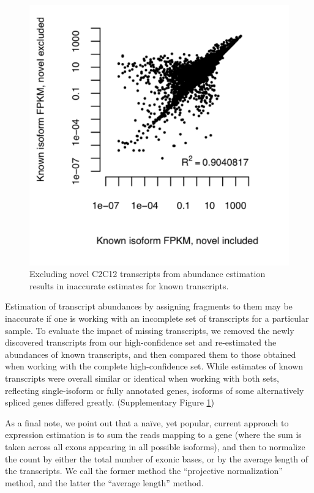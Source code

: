 \documentclass[12pt]{amsart}
\theoremstyle{definition}
\begin{document}
\begin{figure}[!ht] 
    \includegraphics[scale=0.30]{pdfs/vs_no_discovery_small.pdf}
    \caption[Improved abundance accuracy with novel
    transcripts]{Excluding novel C2C12 transcripts from abundance
      estimation results in inaccurate estimates for known transcripts. \label{vs_no_discovery}}
\end{figure}

Estimation of transcript abundances by assigning fragments to them may be inaccurate if
one is working with an incomplete set of transcripts for a particular sample.
To evaluate the impact of missing transcripts, we removed the newly discovered
transcripts from our high-confidence set and re-estimated the abundances of
known transcripts, and then compared them to those obtained when working with
the complete high-confidence set. While estimates of known transcripts were
overall similar or identical when working with both sets, reflecting
single-isoform or fully annotated genes, isoforms of some alternatively
spliced genes differed greatly. (Supplementary Figure \ref{vs_no_discovery})

As a final note, we point out that a na\"{i}ve, yet popular, current
approach to expression estimation is to sum the reads mapping to a
gene (where the sum is taken across all exons appearing in all
possible isoforms), and then to normalize the count by either the
total number of exonic bases, or by the average length of the
transcripts. We call the former method the ``projective normalization''
method, and the latter the ``average length'' method.
\end{document}
